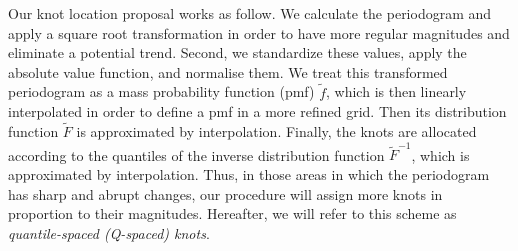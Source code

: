 \documentclass[twocolumn,final]{svjour3}
\newcommand{\bm}[1]{\mbox{\boldmath $#1$}}
\newcommand{\pmr}{ \color{red}}
\begin{document}
Our knot location proposal works as follow.  We calculate the periodogram and apply a square root transformation in order to have more regular magnitudes and eliminate a potential trend.  Second, we standardize these values, apply the absolute value function, {\pmr and normalise them}.  We treat this transformed periodogram as a {\pmr mass probability} function (pmf) $\widetilde{f}$,{\pmr which is then linearly interpolated in order to define a pmf in a more refined grid.}  Then its distribution function $\widetilde{F}$ is {\pmr approximated by interpolation}.  Finally, the knots are allocated according to the quantiles of the inverse distribution function $\widetilde{F}^{-1}$, {\pmr which is approximated by interpolation.}  Thus, in those areas in which the periodogram has sharp and abrupt changes, our procedure will assign more knots in proportion to their magnitudes. Hereafter, we will refer to this scheme as {\em  quantile-spaced (Q-spaced) knots}.%

\end{document}
